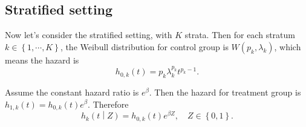 \documentclass[a4paper,12pt]{article}
\begin{document}
\subsection{Stratified setting}
\label{sec:stratified-setting}

Now let's consider the stratified setting, with $K$ strata. Then for each stratum $k\in\left\{1, \cdots, K\right\}$, the Weibull distribution for control group is $W\left(p_k, \lambda_k\right)$, which means the hazard is
\[
  h_{0, k}\left(t\right) = p_k\lambda_k^{p_k}t^{p_k - 1}.
\]

Assume the constant hazard ratio is $e^\beta$. Then the hazard for treatment group is $h_{1, k}\left(t\right) = h_{0, k}\left(t\right)e^\beta$. Therefore
\[
  h_k\left(t\middle|Z\right) = h_{0, k}\left(t\right)e^{\beta Z},\quad Z\in\left\{0, 1\right\}. 
\]
\end{document}

